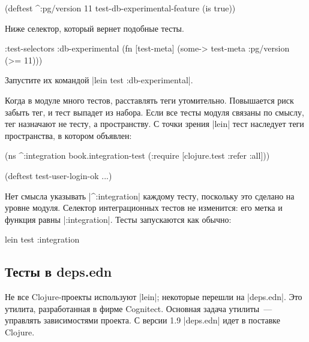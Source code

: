\begin{english}
  \begin{clojure}
(deftest ^{:pg/version 11}
  test-db-experimental-feature
  (is true))
  \end{clojure}
\end{english}

Ниже селектор, который вернет подобные тесты.

\begin{english}
  \begin{clojure}
:test-selectors
{:db-experimental
 (fn [test-meta]
   (some-> test-meta :pg/version (>= 11)))}
  \end{clojure}
\end{english}

Запустите их командой \spverb|lein test :db-experimental|.

Когда в модуле много тестов, расставлять теги утомительно. Повышается риск
забыть тег, и тест выпадет из набора. Если все тесты модуля связаны по смыслу,
тег назначают не тесту, а пространству. С точки зрения \spverb|lein| тест
наследует теги пространства, в котором объявлен:

\begin{english}
  \begin{clojure}
(ns ^:integration
  book.integration-test
  (:require [clojure.test :refer :all]))

(deftest test-user-login-ok
  ...)
  \end{clojure}
\end{english}

Нет смысла указывать \spverb|^:integration| каждому тесту, поскольку это сделано
на уровне модуля. Селектор интеграционных тестов не изменится: его метка и
функция равны \spverb|:integration|. Тесты запускаются как обычно:

\begin{english}
  \begin{clojure}
lein test :integration
  \end{clojure}
\end{english}

\subsection{Тесты в deps.edn}

Не все Clojure-проекты используют \spverb|lein|; некоторые перешли на
\spverb|deps.edn|. Это утилита,
разработанная в фирме Cognitect. Основная задача утилиты~--- управлять
зависимостями проекта. С версии 1.9 \spverb|deps.edn| идет в поставке Clojure.

